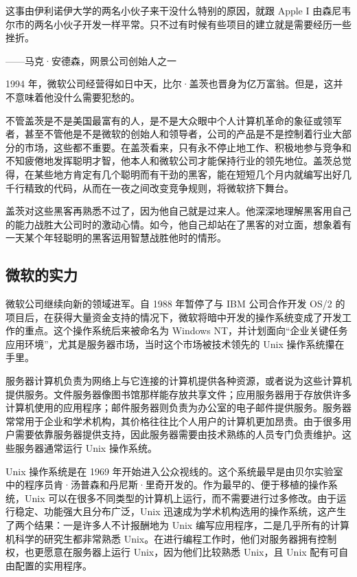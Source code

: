 \documentclass[12pt,UTF8]{ctexbook}
\begin{document}
这事由伊利诺伊大学的两名小伙子来干没什么特别的原因，就跟 Apple I 由森尼韦尔市的两名小伙子开发一样平常。只不过有时候有些项目的建立就是需要经历一些挫折。

——马克·安德森，网景公司创始人之一



1994 年，微软公司经营得如日中天，比尔·盖茨也晋身为亿万富翁。但是，这并不意味着他没什么需要犯愁的。

不管盖茨是不是美国最富有的人，是不是大众眼中个人计算机革命的象征或领军者，甚至不管他是不是微软的创始人和领导者，公司的产品是不是控制着行业大部分的市场，这些都不重要。在盖茨看来，只有永不停止地工作、积极地参与竞争和不知疲倦地发挥聪明才智，他本人和微软公司才能保持行业的领先地位。盖茨总觉得，在某些地方肯定有几个聪明而有干劲的黑客，能在短短几个月内就编写出好几千行精致的代码，从而在一夜之间改变竞争规则，将微软挤下舞台。

盖茨对这些黑客再熟悉不过了，因为他自己就是过来人。他深深地理解黑客用自己的能力战胜大公司时的激动心情。如今，他自己却站在了黑客的对立面，想象着有一天某个年轻聪明的黑客运用智慧战胜他时的情形。





\subsection{微软的实力}


微软公司继续向新的领域进军。自 1988 年暂停了与 IBM 公司合作开发 OS/2 的项目后，在获得大量资金支持的情况下，微软将暗中开发的操作系统变成了开发工作的重点。这个操作系统后来被命名为 Windows NT，并计划面向“企业关键任务应用环境”，尤其是服务器市场，当时这个市场被技术领先的 Unix 操作系统攥在手里。

服务器计算机负责为网络上与它连接的计算机提供各种资源，或者说为这些计算机提供服务。文件服务器像图书馆那样能存放共享文件；应用服务器用于存放供许多计算机使用的应用程序；邮件服务器则负责为办公室的电子邮件提供服务。服务器常常用于企业和学术机构，其价格往往比个人用户的计算机更加昂贵。由于很多用户需要依靠服务器提供支持，因此服务器需要由技术熟练的人员专门负责维护。这些服务器通常运行 Unix 操作系统。

Unix 操作系统是在 1969 年开始进入公众视线的。这个系统最早是由贝尔实验室中的程序员肯·汤普森和丹尼斯·里奇开发的。作为最早的、便于移植的操作系统，Unix 可以在很多不同类型的计算机上运行，而不需要进行过多修改。由于运行稳定、功能强大且分布广泛，Unix 迅速成为学术机构选用的操作系统，这产生了两个结果：一是许多人不计报酬地为 Unix 编写应用程序，二是几乎所有的计算机科学的研究生都非常熟悉 Unix。在进行编程工作时，他们对服务器拥有控制权，也更愿意在服务器上运行 Unix，因为他们比较熟悉 Unix，且 Unix 配有可自由配置的实用程序。
\end{document}
